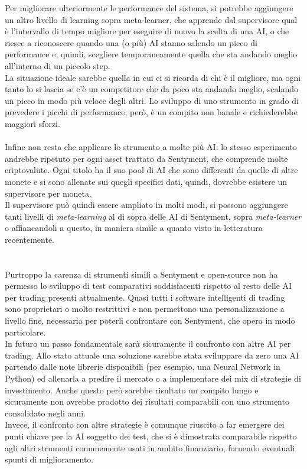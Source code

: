 \documentclass[a4paper,12pt]{report}
\begin{document}
\begin{fig}
Per migliorare ulteriormente le performance del sistema, si potrebbe aggiungere un altro livello di learning sopra meta-learner, che apprende dal supervisore qual è l'intervallo di tempo migliore per eseguire di nuovo la scelta di una AI, o che riesce a riconoscere quando una (o più) AI stanno salendo un picco di performance e, quindi, scegliere temporaneamente quella che sta andando meglio all'interno di un piccolo step.\\ La situazione ideale sarebbe quella in cui ci si ricorda di chi è il migliore, ma ogni tanto lo si lascia se c'è un competitore che da poco sta andando meglio, scalando un picco in modo più veloce degli altri. Lo sviluppo di uno strumento in grado di prevedere i picchi di performance, però, è un compito non banale e richiederebbe maggiori sforzi.
\\~\\ Infine non resta che applicare lo strumento a molte più AI: lo stesso esperimento andrebbe ripetuto per ogni asset trattato da Sentyment, che comprende molte criptovalute. Ogni titolo ha il suo pool di AI che sono differenti da quelle di altre monete e si sono allenate sui quegli specifici dati, quindi, dovrebbe esistere un supervisore per moneta.\\ Il supervisore può quindi essere ampliato in molti modi, si possono aggiungere tanti livelli di \textit{meta-learning} al di sopra delle AI di Sentyment, sopra \textit{meta-learner} o affiancandoli a questo, in maniera simile a quanto visto in letteratura recentemente.\\~\\\\
Purtroppo la carenza di strumenti simili a Sentyment e open-source non ha permesso lo sviluppo di test comparativi soddisfacenti rispetto al resto delle AI per trading presenti attualmente. Quasi tutti i software intelligenti di trading sono proprietari o molto restrittivi e non permettono una personalizzazione a livello fine, necessaria per poterli confrontare con Sentyment, che opera in modo particolare.\\ In futuro un passo fondamentale sarà sicuramente il confronto con altre AI per trading. Allo stato attuale una soluzione sarebbe stata sviluppare da zero una AI partendo dalle note librerie disponibili (per esempio, una Neural Network in Python) ed allenarla a predire il mercato o a implementare dei mix di strategie di investimento. Anche questo però sarebbe risultato un compito lungo e sicuramente non avrebbe prodotto dei risultati comparabili con uno strumento consolidato negli anni.\\ Invece, il confronto con altre strategie è comunque riuscito a far emergere dei punti chiave per la AI soggetto dei test, che si è dimostrata comparabile rispetto agli altri strumenti comunemente usati in ambito finanziario, fornendo eventuali spunti di miglioramento. \\~\\

\end{fig}
\end{document}
